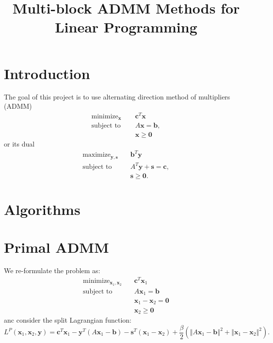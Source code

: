 \documentclass{article}
\title{Multi-block ADMM Methods for Linear Programming }
\author{\studentname}
\begin{document}
\maketitle
\vspace{0.1in}
\maketitle



\section{Introduction}

The goal of this project is to use alternating direction method of multipliers (ADMM)
\begin{align}
\text{minimize}_{\mathbf{x}} &\quad \mathbf{c}^T\mathbf{x} \tag{OPT1}\label{OPT1} \\
\text{subject to } &\quad  A \mathbf{x} = \mathbf{b},  \nonumber \\
&\quad \mathbf{x} \geq \mathbf{0} \nonumber 
\end{align}
or its dual
\begin{align}
\text{maximize}_{\mathbf{y}, \mathbf{s}} &\quad \mathbf{b}^T\mathbf{y}  \tag{OPT2}\label{OPT2} \\
\text{subject to } &\quad  A^T \mathbf{y}  + \mathbf{s} = \mathbf{c},  \nonumber \\
&\quad \mathbf{s} \geq \mathbf{0} \nonumber.
\end{align}

\section{Algorithms}

\section*{Primal ADMM }
We re-formulate the problem as:
\begin{align}
\text{minimize}_{ \mathbf{x}_{1}, \mathbf{x}_{2}} &\quad \mathbf{c}^T\mathbf{x}_1 \tag{OPT3}\label{OPT3} \\
\text{subject to  \ \  } &\quad  A \mathbf{x}_{1} = \mathbf{b}  \nonumber \\
&\quad \mathbf{x}_{1}  - \mathbf{x}_{2} = \mathbf{0}  \nonumber \\
&\quad \mathbf{x}_{2} \geq \mathbf{0} \nonumber 
\end{align}
anc consider the split Lagrangian function:
\[
L^{P}(\mathbf{x}_{1},\mathbf{x}_{2},\mathbf{y})=\mathbf{c}^{T}\mathbf{x}_{1}-\mathbf{y}^{T}\left(A\mathbf{x}_{1}-\mathbf{b}\right)-\mathbf{s}^{T}\left(\mathbf{x}_{1}-\mathbf{x}_{2}\right)+\frac{\beta}{2}\left(\left\Vert A\mathbf{x}_{1}-\mathbf{b}\right\Vert ^{2}+\left\Vert \mathbf{x}_{1}-\mathbf{x}_{2}\right\Vert ^{2}\right).
\]
\end{document}
